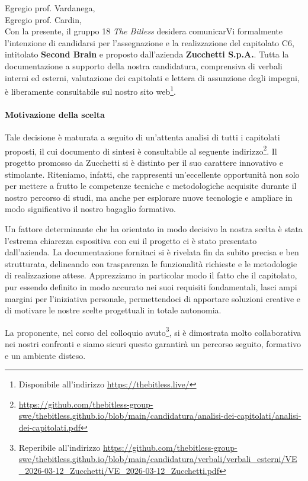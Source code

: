\documentclass[a4paper, 10pt, colorlinks=true, linkcolor=black, urlcolor=blue, citecolor=blue, hidelinks]{article}
\begin{document}

\newpage

\noindent Egregio prof. Vardanega, \\
Egregio prof. Cardin, \\

\noindent Con la presente, il gruppo 18 \textit{The Bitless} desidera comunicarVi formalmente l'intenzione di candidarsi per l'assegnazione e la realizzazione del capitolato C6, intitolato \textbf{Second Brain} e proposto dall'azienda \textbf{Zucchetti S.p.A.}.
Tutta la documentazione a supporto della nostra candidatura, comprensiva di verbali interni ed esterni, valutazione dei capitolati e lettera di assunzione degli impegni, è liberamente consultabile sul nostro sito web\footnote{Disponibile all'indirizzo \url{https://thebitless.live/}}.

\paragraph{Motivazione della scelta}
Tale decisione è maturata a seguito di un'attenta analisi di tutti i capitolati proposti, il cui documento di sintesi è consultabile al seguente indirizzo\footnote{\url{https://github.com/thebitless-group-swe/thebitless.github.io/blob/main/candidatura/analisi-dei-capitolati/analisi-dei-capitolati.pdf}}.
Il progetto promosso da Zucchetti si è distinto per il suo carattere innovativo e stimolante. Riteniamo, infatti, che rappresenti un'eccellente opportunità non solo per mettere a frutto le competenze tecniche e metodologiche acquisite durante il nostro percorso di studi, ma anche per esplorare nuove tecnologie e ampliare in modo significativo il nostro bagaglio formativo. 

Un fattore determinante che ha orientato in modo decisivo la nostra scelta è stata l'estrema chiarezza espositiva con cui il progetto ci è stato presentato dall'azienda. La documentazione fornitaci si è rivelata fin da subito precisa e ben strutturata, delineando con trasparenza le funzionalità richieste e le metodologie di realizzazione attese. Apprezziamo in particolar modo il fatto che il capitolato, pur essendo definito in modo accurato nei suoi requisiti fondamentali, lasci ampi margini per l'iniziativa personale, permettendoci di apportare soluzioni creative e di motivare le nostre scelte progettuali in totale autonomia.

La proponente, nel corso del colloquio avuto\footnote{Reperibile all'indirizzo \url{https://github.com/thebitless-group-swe/thebitless.github.io/blob/main/candidatura/verbali/verbali_esterni/VE_2026-03-12_Zucchetti/VE_2026-03-12_Zucchetti.pdf}}, si è dimostrata molto collaborativa nei nostri confronti e siamo sicuri questo garantirà un percorso seguito, formativo e un ambiente disteso.
\end{document}
